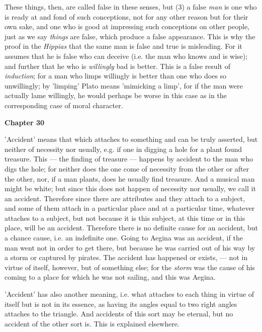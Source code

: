 These things, then, are called false in these senses, but (3) a false \emph{man} is one who is ready at and fond of such conceptions, not for any other reason but for their own sake, and one who is good at impressing such conceptions on other people, just as we say \emph{things} are false, which produce a false appearance. This is why the proof in the \emph{Hippias} that the same man is false and true is misleading. For it assumes that he is false who can deceive (i.e. the man who knows and is wise); and further that he who is \emph{willingly} bad is better. This is a false result of \emph{induction}; for a man who limps willingly is better than one who does so unwillingly; by 'limping' Plato means 'mimicking a limp', for if the man were actually lame willingly, he would perhaps be worse in this case as in the corresponding case of moral character.

\textbf{Chapter 30}

'Accident' means that which attaches to something and can be truly asserted, but neither of necessity nor usually, e.g. if one in digging a hole for a plant found treasure. This — the finding of treasure — happens by accident to the man who digs the hole; for neither does the one come of necessity from the other or after the other, nor, if a man plants, does he usually find treasure. And a musical man might be white; but since this does not happen of necessity nor usually, we call it an accident. Therefore since there are attributes and they attach to a subject, and some of them attach in a particular place and at a particular time, whatever attaches to a subject, but not because it is this subject, at this time or in this place, will be an accident. Therefore there is no definite cause for an accident, but a chance cause, i.e. an indefinite one. Going to Aegina was an accident, if the man went not in order to get there, but because he was carried out of his way by a storm or captured by pirates. The accident has happened or exists, — not in virtue of itself, however, but of something else; for the \emph{storm} was the cause of his coming to a place for which he was not sailing, and this was Aegina.

'Accident' has also another meaning, i.e. what attaches to each thing in virtue of itself but is not in its essence, as having its angles equal to two right angles attaches to the triangle. And accidents of this sort may be eternal, but no accident of the other sort is. This is explained elsewhere.


